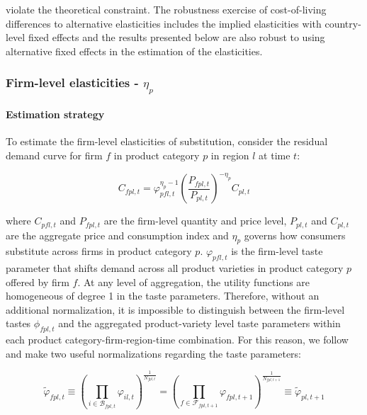 violate the theoretical constraint. The robustness exercise of cost-of-living differences to alternative elasticities includes the implied elasticities with country-level fixed effects and the results presented below are also robust to using alternative fixed effects in the estimation of the elasticities.

\subsubsection{Firm-level elasticities - $\eta_p$}
\paragraph{Estimation strategy}     To estimate the firm-level elasticities of substitution, consider the residual demand curve for firm $f$ in product category $p$ in region $l$ at time $t$: 
\begin{linenomath*}
    \begin{equation*}
        C_{fpl,t} = \varphi_{pfl,t}^{\eta_p-1}\left(\frac{P_{fpl,t}}{P_{pl,t}}\right)^{-\eta_p}C_{pl,t}  
    \end{equation*}
\end{linenomath*}
\noindent where $C_{pfl,t}$ and  $P_{fpl,t}$ are the firm-level quantity and price level, $P_{pl,t}$ and $C_{pl,t}$ are the aggregate price and consumption index and $\eta_p$ governs how consumers substitute across firms in product category $p$. $\varphi_{pfl,t}$ is the firm-level taste parameter that shifts demand across all product varieties in product category $p$ offered by firm $f$. At any level of aggregation, the utility functions are homogeneous of degree 1 in the taste parameters. Therefore, without an additional normalization, it is impossible to distinguish between the firm-level tastes $\phi_{fpl,t}$ and the aggregated product-variety level taste parameters within each product category-firm-region-time combination. For this reason, we follow \cite{Hottman2016} and make two useful normalizations regarding the taste parameters: 
\begin{linenomath*}
    \begin{equation*}
        \tilde{\varphi}_{fpl,t} 
            \equiv  \left(\prod_{i \in \mathcal{B}_{fpl,t}} \varphi_{il,t} \right)^{\frac{1}{N_{fpl,t}}}
            =       \left(\prod_{f \in \mathcal{F}_{fpl,t+1}} \varphi_{fpl,t+1} \right)^{\frac{1}{N_{fpl,t+1}}}
            \equiv \tilde{\varphi}_{pl,t+1}
    \end{equation*}
\end{linenomath*}
